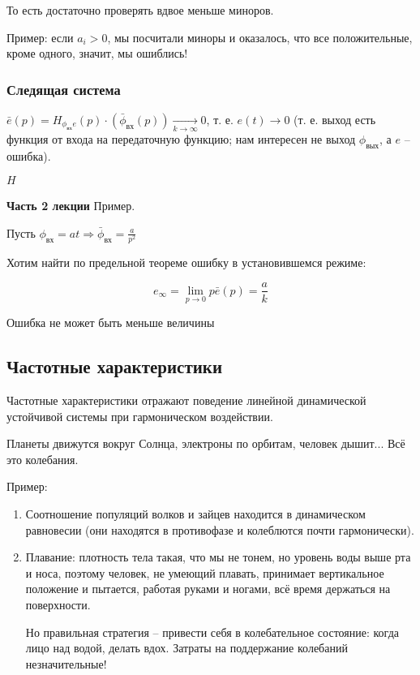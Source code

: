 \documentclass[main.tex]{subfiles}
\begin{document}
То есть достаточно проверять вдвое меньше миноров.

Пример: если $ a_i > 0 $, мы посчитали миноры и оказалось, что все положительные, кроме одного, значит, мы ошиблись! 

\subsubsection{Следящая система}


$ \bar e(p) = H_{\phi_{\text{вх}} e}(p) \cdot (\bar \phi_{\text{вх}}(p)) \xrightarrow[k \to \infty]{} 0 $, т. е. $ e(t) \to 0 $
(т. е. выход есть функция от входа на передаточную функцию; нам интересен не выход $\phi_{\text{вых}}$, а $e$ -- ошибка).

$ H_{} $ %


\Large \textbf{Часть 2 лекции} \normalsize
Пример.

Пусть $\phi_{\text{вх}} = at \Rightarrow \bar \phi_{\text{вх}} = \frac{a}{p^2}$

Хотим найти по предельной теореме ошибку в установившемся режиме:

$$ e_\infty = \lim\limits_{p \to 0} p \bar e(p) = \frac{a}{k} $$


Ошибка не может быть меньше величины

\subsection{Частотные характеристики}

Частотные характеристики отражают поведение линейной динамической устойчивой системы при гармоническом воздействии.

Планеты движутся вокруг Солнца, электроны по орбитам, человек дышит...
Всё это колебания.

Пример:
\begin{enumerate}[noitemsep]
	\item Соотношение популяций волков и зайцев находится в динамическом равновесии (они находятся в противофазе и колеблются почти гармонически).
	\item Плавание: плотность тела такая, что мы не тонем, но уровень воды выше рта и носа, поэтому человек, не умеющий плавать, принимает вертикальное положение и пытается, работая руками и ногами, всё время держаться на поверхности.
	
	Но правильная стратегия -- привести себя в колебательное состояние: когда лицо над водой, делать вдох.
	Затраты на поддержание колебаний незначительные!
\end{enumerate}
\end{document}
